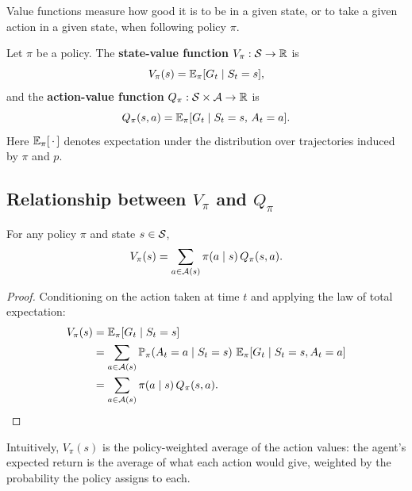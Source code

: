 Value functions measure how good it is to be in a given state, or to take a given action in a given state, when following policy $\pi$.

\begin{definition}
\label{def:value-functions}
Let $\pi$ be a policy. The \textbf{state-value function} $V_\pi : \mathcal{S} \to \mathbb{R}$ is
\begin{equation}
\label{eq:state-value}
V_\pi(s) = \operatorname{\mathbb{E}}_\pi[G_t \mid S_t = s],
\end{equation}
and the \textbf{action-value function} $Q_\pi : \mathcal{S} \times \mathcal{A} \to \mathbb{R}$ is
\begin{equation}
\label{eq:action-value}
Q_\pi(s, a) = \operatorname{\mathbb{E}}_\pi[G_t \mid S_t = s,\, A_t = a].
\end{equation}
Here $\operatorname{\mathbb{E}}_\pi[\,\cdot\,]$ denotes expectation under the distribution over trajectories induced by $\pi$ and $p$.
\end{definition}

\subsection*{Relationship between $V_\pi$ and $Q_\pi$}

\begin{proposition}
\label{prop:v-q-relation}
For any policy $\pi$ and state $s \in \mathcal{S}$,
\begin{equation}
\label{eq:v-q-relation}
V_\pi(s) = \sum_{a \in \mathcal{A}(s)} \pi(a \mid s)\, Q_\pi(s, a).
\end{equation}
\end{proposition}

\begin{proof}
Conditioning on the action taken at time $t$ and applying the law of total expectation:
\begin{align*}
V_\pi(s)
&= \operatorname{\mathbb{E}}_\pi[G_t \mid S_t = s] \\
&= \sum_{a \in \mathcal{A}(s)} \mathbb{P}_\pi(A_t = a \mid S_t = s)\,
   \operatorname{\mathbb{E}}_\pi[G_t \mid S_t = s, A_t = a] \\
&= \sum_{a \in \mathcal{A}(s)} \pi(a \mid s)\, Q_\pi(s, a). \qedhere
\end{align*}
\end{proof}

Intuitively, $V_\pi(s)$ is the policy-weighted average of the action values: the agent's expected return is the average of what each action would give, weighted by the probability the policy assigns to each.

